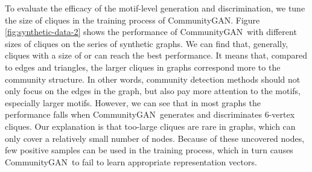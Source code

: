 \documentclass[sigconf]{acmart}
\newcommand{\ComGAN}{CommunityGAN}
\begin{document}
To evaluate the efficacy of the motif-level generation and discrimination, we tune the size of cliques in the training process of \ComGAN.
Figure \ref{fig:synthetic-data-2} shows the performance of \ComGAN~with different sizes of cliques on the series of synthetic graphs.
We can find that, generally, cliques with a size of  or  can reach the best performance.
It means that, compared to edges and triangles, the larger cliques in graphs correspond more to the community structure.
In other words, community detection methods should not only focus on the edges in the graph, but also pay more attention to the motifs, especially larger motifs.
However, we can see that in most graphs the performance falls when \ComGAN~generates and discriminates 6-vertex cliques.
Our explanation is that too-large cliques are rare in graphs, which can only cover a relatively small number of nodes.
Because of these uncovered nodes, few positive samples can be used in the training process, which in turn causes \ComGAN~to fail to learn appropriate representation vectors.
\end{document}
